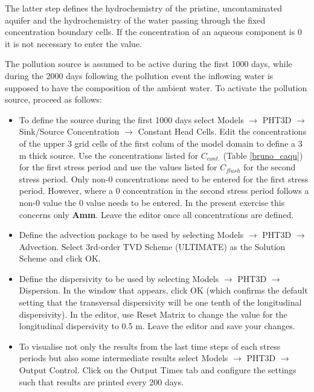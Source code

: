 The latter step defines the hydrochemistry of the pristine, 
uncontaminated aquifer and the hydrochemistry of the
water passing through the fixed concentration boundary cells. If the concentration of
an aqueous component is 0 it is not necessary to enter the value.

The pollution source is assumed to be active during the first 1000 days, while 
during the 2000 days following the pollution event the inflowing water is supposed
to have the composition of the ambient water. To activate the pollution source, proceed as follows:

\begin{itemize}

\item To define the source during the first 1000 days select Models $\rightarrow$ PHT3D $\rightarrow$ Sink/Source Concentration $\rightarrow$ Constant Head Cells. 
Edit the concentrations of the upper 3 grid cells of the first colum of the model domain
to define a 3 m thick source. 
Use the concentrations listed for $C_{cont.}$ (Table \ref{bruno_caqu}) for the first
stress period and use the values listed for $C_{flush}$ for the second stress period. 
Only non-0 concentrations need to be entered for the first 
stress period. However, where a 0 concentration in the second stress period
follows a non-0 value the 0 value needs to be entered. In the present exercise
this concerns only {\color{red} \textbf{Amm}}. Leave the editor
once all concentrations are defined.

\item Define the advection package to be used by selecting Models $\rightarrow$ PHT3D $\rightarrow$ Advection. Select 3rd-order TVD Scheme (ULTIMATE) as the Solution Scheme and click OK.

\item Define the dispersivity to be used by selecting Models $\rightarrow$ PHT3D $\rightarrow$ Dispersion. In the window that appears, click OK (which confirms the default setting that the transversal dispersivity will be one tenth of the longitudinal dispersivity). In the editor, use Reset Matrix to change the value for the longitudinal dispersivity to 0.5 m. Leave the editor and save your changes.

\item To visualise not only the results from the last time steps of each stress periods but also some intermediate results select Models $\rightarrow$ PHT3D $\rightarrow$ Output Control. Click on the Output Times tab and configure the settings such that results are printed every 200 days.


\end{itemize}
